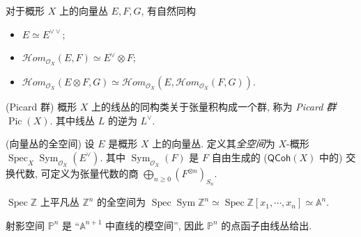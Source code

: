 \documentclass{book}
\newcommand{\internalhom}{\mathcal{H}om}
\newcommand{\todo}[1]{{\color{blue}\fbox{TODO: \textbf{#1}}}}
\begin{document}
	\begin{prop}
		[label={vector-bundle-identities}]
		{}
		对于概形 $X$ 上的向量丛 $E,F,G$, 有自然同构
		\begin{itemize}
			\item $E \simeq E^{\vee\vee}$;
			\item $\internalhom_{\mathcal O_X}(E,F)\simeq E^\vee\otimes F$;
			\item $\internalhom_{\mathcal O_X}(E\otimes F,G) \simeq \internalhom_{\mathcal O_X}(E,\internalhom_{\mathcal O_X}(F,G))$.
		\end{itemize}
	\end{prop}
	
	\begin{prop}
		{(Picard 群)}
		概形 $X$ 上的线丛的同构类关于张量积构成一个群, 称为 \emph{Picard 群} $\operatorname{Pic}(X)$. 其中线丛 $L$ 的逆为 $L^\vee$.
	\end{prop}
	
	\begin{definition}
		{(向量丛的全空间)}
		设 $E$ 是概形 $X$ 上的向量丛. 定义其\emph{全空间}为 $X$-概形
		$\operatorname{Spec}_X\operatorname{Sym}_{\mathcal O_X}(E^{\vee})$. 其中 $\operatorname{Sym}_{\mathcal O_X}(F)$ 是 $F$ 自由生成的 ($\mathsf{QCoh}(X)$ 中的) 交换代数, 可定义为张量代数的商 $\bigoplus_{n\geq 0}(F^{\otimes n})_{S_n}$.
	\end{definition}
	
	\begin{example}
		{}
		$\operatorname{Spec} \mathbb{Z}$ 上平凡丛 $\mathbb{Z}^n$ 的全空间为 $\operatorname{Spec}\operatorname{Sym}\mathbb{Z}^n\simeq \operatorname{Spec}\mathbb{Z}[x_1,\cdots,x_n] \simeq\mathbb A^n$.
	\end{example}
	
	射影空间 $\mathbb P^n$ 是 ``$\mathbb A^{n+1}$ 中直线的模空间'', 因此 $\mathbb P^n$ 的点函子由线丛给出.
	
\end{document}
